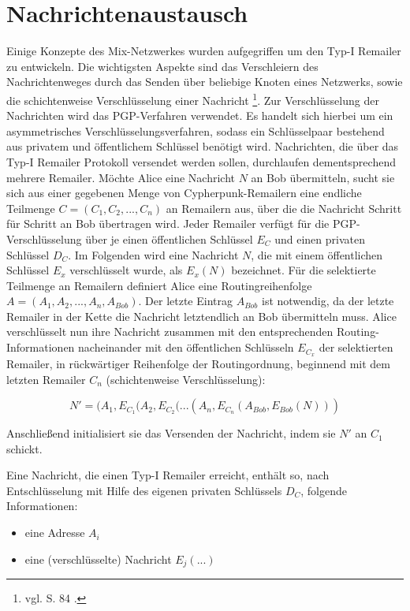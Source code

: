 \section{Nachrichtenaustausch}
Einige Konzepte des Mix-Netzwerkes wurden aufgegriffen um den Typ-I Remailer zu entwickeln. Die wichtigsten Aspekte sind das Verschleiern des Nachrichtenweges durch das Senden über beliebige Knoten eines Netzwerks, sowie die schichtenweise Verschlüsselung einer Nachricht \footnote{vgl. S. 84 \cite{sambleben2013informationstechnologie}.}. Zur Verschlüsselung der Nachrichten wird das PGP-Verfahren verwendet. Es handelt sich hierbei um ein asymmetrisches Verschlüsselungsverfahren, sodass ein Schlüsselpaar bestehend aus privatem und öffentlichem Schlüssel benötigt wird.
Nachrichten, die über das Typ-I Remailer Protokoll versendet werden sollen, durchlaufen dementsprechend mehrere Remailer. Möchte Alice eine Nachricht \(N\) an Bob übermitteln, sucht sie sich aus einer gegebenen Menge von Cypherpunk-Remailern eine endliche Teilmenge \(C = (C_1, C_2, ..., C_n)\) an Remailern aus, über die die Nachricht Schritt für Schritt an Bob übertragen wird. Jeder Remailer verfügt für die PGP-Verschlüsselung über je einen öffentlichen Schlüssel \(E_C\) und einen privaten Schlüssel \(D_C\). Im Folgenden wird eine Nachricht \(N\), die mit einem öffentlichen Schlüssel \(E_x\) verschlüsselt wurde, als \(E_x(N)\) bezeichnet. Für die selektierte Teilmenge an Remailern definiert Alice eine Routingreihenfolge \(A = (A_1, A_2, ..., A_n, A_{Bob})\). Der letzte Eintrag \(A_{Bob}\) ist notwendig, da der letzte Remailer in der Kette die Nachricht letztendlich an Bob übermitteln muss.
Alice verschlüsselt nun ihre Nachricht zusammen mit den entsprechenden Routing-Informationen nacheinander mit den öffentlichen Schlüsseln \(E_{C_x}\) der selektierten Remailer, in rückwärtiger Reihenfolge der Routingordnung, beginnend mit dem letzten Remailer \(C_n\) (schichtenweise Verschlüsselung):

\begin{equation}
N' = (A_1, E_{C_1}(A_2, E_{C_2} (... (A_n,  E_{C_n}(A_{Bob}, E_{Bob}(N)))
\end{equation}

Anschließend initialisiert sie das Versenden der Nachricht, indem sie \(N'\) an \(C_1\) schickt.

Eine Nachricht, die einen Typ-I Remailer erreicht, enthält so, nach Entschlüsselung mit Hilfe des eigenen privaten Schlüssels \(D_C\), folgende Informationen:
\begin{itemize}
\item eine Adresse \(A_i\)
\item eine (verschlüsselte) Nachricht \(E_j(...)\)
\end{itemize}

